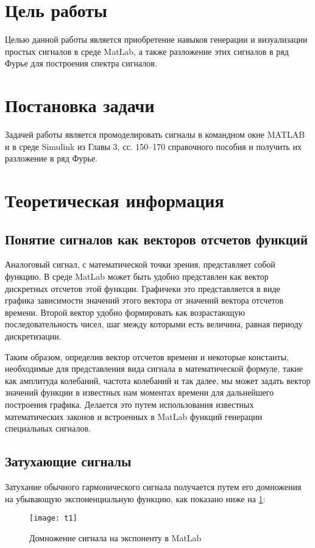 







\section{Цель работы}
Целью данной работы является приобретение навыков генерации и визуализации простых сигналов в среде MatLab, а также разложение этих сигналов в ряд Фурье для построения спектра сигналов.

\section{Постановка задачи}
Задачей работы является промоделировать сигналы в командном окне MATLAB и в среде Simulink из Главы 3, сс. 150–170 справочного пособия и получить их разложение в ряд Фурье.

\section{Теоретическая информация}
\subsection{Понятие сигналов как векторов отсчетов функций}
Аналоговый сигнал, с математической точки зрения, представляет собой функцию. В среде  MatLab может быть удобно представлен как вектор дискретных отсчетов этой функции. Графичеки это представляется в виде графика зависимости значений этого вектора от значений вектора отсчетов времени. Второй вектор удобно формировать как возрастающую последовательность чисел, шаг между которыми есть величина, равная периоду дискретизации.

Таким образом, определив вектор отсчетов времени и некоторые константы, необходимые для представления вида сигнала в математической формуле, такие как амплитуда колебаний, частота колебаний и так далее, мы может задать вектор значений функции в известных нам моментах времени для дальнейшего построения графика. Делается это путем использования известных математических законов и встроенных в MatLab функций генерации специальных сигналов.

\subsection{Затухающие сигналы}
Затухание обычного гармонического сигнала получается путем его домножения на убывающую экспоненциальную функцию, как показано ниже на \ref{pic:t1}:
\begin{figure}[H]
	\begin{center}
		\texttt{[image: t1]}
		\caption{Домножение сигнала на экспоненту в MatLab} 
		\label{pic:t1} %
	\end{center}
\end{figure}

